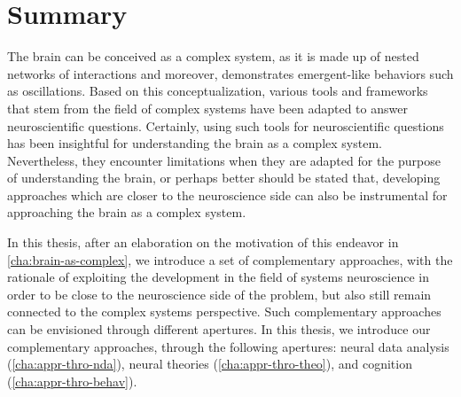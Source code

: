 \begingroup
\let\clearpage\relax
\let\cleardoublepage\relax
\let\cleardoublepage\relax

\chapter*{Summary} %

The brain can be conceived as a complex system,
as it is made up of nested networks of interactions
and moreover,
demonstrates emergent-like behaviors such as oscillations.
Based on this conceptualization,
various tools and frameworks that stem from the field of complex systems
have been adapted to answer neuroscientific questions.
Certainly, using such tools for neuroscientific questions has been insightful for understanding the brain as a complex system.
Nevertheless,
they encounter limitations when they are adapted for the purpose of understanding the brain,
or perhaps better should be stated that,
developing approaches which are closer to the neuroscience side can also be instrumental for approaching the brain as a complex system.


In this thesis, after an elaboration on the motivation of this endeavor in \autoref{cha:brain-as-complex},
we introduce a set of complementary approaches,
with the rationale of exploiting the development in the field of systems neuroscience in order to
be close to the neuroscience side of the problem,
but also still remain connected to the complex systems perspective.
Such complementary approaches can be envisioned through different apertures.
In this thesis, we introduce our complementary approaches,
through the following apertures:
neural data analysis (\autoref{cha:appr-thro-nda}),
neural theories (\autoref{cha:appr-thro-theo}), and
cognition (\autoref{cha:appr-thro-behav}).

